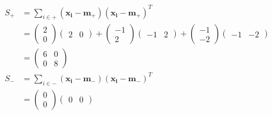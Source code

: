 \documentclass[11pt, a4paper]{article}
\begin{document}
\begin{align*}    
	S_+              & = \sum_{i \in +}(\boldsymbol{x_i} -\boldsymbol{m_+})(\boldsymbol{x_i} -\boldsymbol{m_+})^T \\
	                 & = \begin{pmatrix}                                                                          
	2 \\
	0
	\end{pmatrix} \begin{pmatrix}
	2                & 0                                                                                          
	\end{pmatrix} + \begin{pmatrix}
	-1 \\
	2
	\end{pmatrix} \begin{pmatrix}
	-1               & 2                                                                                          
	\end{pmatrix} + \begin{pmatrix}
	-1 \\
	-2
	\end{pmatrix} \begin{pmatrix}
	-1               & -2                                                                                         
	\end{pmatrix}  \\
	                 & = \begin{pmatrix}                                                                          
	6                & 0                                                                                          \\
	0                & 8                                                                                          
	\end{pmatrix} \\
	S_-              & = \sum_{i \in -}(\boldsymbol{x_i} -\boldsymbol{m_-})(\boldsymbol{x_i} -\boldsymbol{m_-})^T \\
	                 & = \begin{pmatrix}                                                                          
	0 \\
	0
	\end{pmatrix} \begin{pmatrix}
	0                & 0                                                                                          

\end{pmatrix}
\end{align*}
\end{document}
